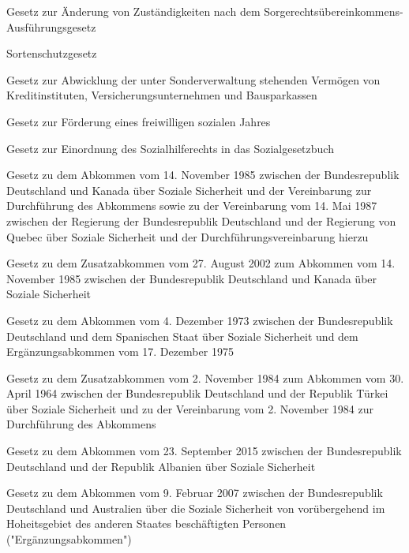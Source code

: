 \item[{SorgeRÜbkAGZustÄndG}] Gesetz zur Änderung von Zuständigkeiten nach dem Sorgerechtsübereinkommens-Ausführungsgesetz

\item[{SortSchG-1985}] Sortenschutzgesetz

\item[{SoVwAbwG}] Gesetz zur Abwicklung der unter Sonderverwaltung stehenden Vermögen von Kreditinstituten, Versicherungsunternehmen und Bausparkassen

\item[{SozDiG}] Gesetz zur Förderung eines freiwilligen sozialen Jahres

\item[{SozhiEinOG}] Gesetz zur Einordnung des Sozialhilferechts in das Sozialgesetzbuch

\item[{SozSichAbk1985RVbgDVbgCANG}] Gesetz zu dem Abkommen vom 14. November 1985 zwischen der Bundesrepublik Deutschland und Kanada über Soziale Sicherheit und der Vereinbarung zur Durchführung des Abkommens sowie zu der Vereinbarung vom 14. Mai 1987 zwischen der Regierung der Bundesrepublik Deutschland und der Regierung von Quebec über Soziale Sicherheit und der Durchführungsvereinbarung hierzu

\item[{SozSichAbk1985ZusAbkCANG}] Gesetz zu dem Zusatzabkommen vom 27. August 2002 zum Abkommen vom 14. November 1985 zwischen der Bundesrepublik Deutschland und Kanada über Soziale Sicherheit

\item[{SozSichAbk2ErgAbkESPG}] Gesetz zu dem Abkommen vom 4. Dezember 1973 zwischen der Bundesrepublik Deutschland und dem Spanischen Staat über Soziale Sicherheit und dem Ergänzungsabkommen vom 17. Dezember 1975

\item[{SozSichAbkÄndAbk2ZAbkTURG}] Gesetz zu dem Zusatzabkommen vom 2. November 1984 zum Abkommen vom 30. April 1964 zwischen der Bundesrepublik Deutschland und der Republik Türkei über Soziale Sicherheit und zu der Vereinbarung vom 2. November 1984 zur Durchführung des Abkommens

\item[{SozSichAbkALBG}] Gesetz zu dem Abkommen vom 23. September 2015 zwischen der Bundesrepublik Deutschland und der Republik Albanien über Soziale Sicherheit

\item[{SozSichAbkAUSErgAbkG}] Gesetz zu dem Abkommen vom 9. Februar 2007 zwischen der Bundesrepublik Deutschland und Australien über die Soziale Sicherheit von vorübergehend im Hoheitsgebiet des anderen Staates beschäftigten Personen ("Ergänzungsabkommen")

